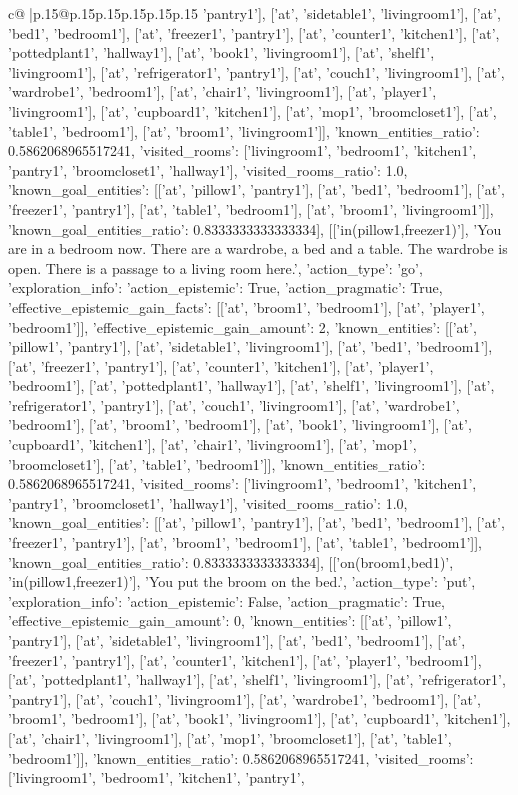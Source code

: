 \documentclass{article}
\begin{document}
{\begin{supertabular}{c@{$\;$}|p{.15\linewidth}@{}p{.15\linewidth}p{.15\linewidth}p{.15\linewidth}p{.15\linewidth}p{.15\linewidth}}
{{{'pantry1'], ['at', 'sidetable1', 'livingroom1'], ['at', 'bed1', 'bedroom1'], ['at', 'freezer1', 'pantry1'], ['at', 'counter1', 'kitchen1'], ['at', 'pottedplant1', 'hallway1'], ['at', 'book1', 'livingroom1'], ['at', 'shelf1', 'livingroom1'], ['at', 'refrigerator1', 'pantry1'], ['at', 'couch1', 'livingroom1'], ['at', 'wardrobe1', 'bedroom1'], ['at', 'chair1', 'livingroom1'], ['at', 'player1', 'livingroom1'], ['at', 'cupboard1', 'kitchen1'], ['at', 'mop1', 'broomcloset1'], ['at', 'table1', 'bedroom1'], ['at', 'broom1', 'livingroom1']], 'known_entities_ratio': 0.5862068965517241, 'visited_rooms': ['livingroom1', 'bedroom1', 'kitchen1', 'pantry1', 'broomcloset1', 'hallway1'], 'visited_rooms_ratio': 1.0, 'known_goal_entities': [['at', 'pillow1', 'pantry1'], ['at', 'bed1', 'bedroom1'], ['at', 'freezer1', 'pantry1'], ['at', 'table1', 'bedroom1'], ['at', 'broom1', 'livingroom1']], 'known_goal_entities_ratio': 0.8333333333333334}}], [['in(pillow1,freezer1)'], 'You are in a bedroom now. There are a wardrobe, a bed and a table. The wardrobe is open. There is a passage to a living room here.', {'action_type': 'go', 'exploration_info': {'action_epistemic': True, 'action_pragmatic': True, 'effective_epistemic_gain_facts': [['at', 'broom1', 'bedroom1'], ['at', 'player1', 'bedroom1']], 'effective_epistemic_gain_amount': 2, 'known_entities': [['at', 'pillow1', 'pantry1'], ['at', 'sidetable1', 'livingroom1'], ['at', 'bed1', 'bedroom1'], ['at', 'freezer1', 'pantry1'], ['at', 'counter1', 'kitchen1'], ['at', 'player1', 'bedroom1'], ['at', 'pottedplant1', 'hallway1'], ['at', 'shelf1', 'livingroom1'], ['at', 'refrigerator1', 'pantry1'], ['at', 'couch1', 'livingroom1'], ['at', 'wardrobe1', 'bedroom1'], ['at', 'broom1', 'bedroom1'], ['at', 'book1', 'livingroom1'], ['at', 'cupboard1', 'kitchen1'], ['at', 'chair1', 'livingroom1'], ['at', 'mop1', 'broomcloset1'], ['at', 'table1', 'bedroom1']], 'known_entities_ratio': 0.5862068965517241, 'visited_rooms': ['livingroom1', 'bedroom1', 'kitchen1', 'pantry1', 'broomcloset1', 'hallway1'], 'visited_rooms_ratio': 1.0, 'known_goal_entities': [['at', 'pillow1', 'pantry1'], ['at', 'bed1', 'bedroom1'], ['at', 'freezer1', 'pantry1'], ['at', 'broom1', 'bedroom1'], ['at', 'table1', 'bedroom1']], 'known_goal_entities_ratio': 0.8333333333333334}}], [['on(broom1,bed1)', 'in(pillow1,freezer1)'], 'You put the broom on the bed.', {'action_type': 'put', 'exploration_info': {'action_epistemic': False, 'action_pragmatic': True, 'effective_epistemic_gain_amount': 0, 'known_entities': [['at', 'pillow1', 'pantry1'], ['at', 'sidetable1', 'livingroom1'], ['at', 'bed1', 'bedroom1'], ['at', 'freezer1', 'pantry1'], ['at', 'counter1', 'kitchen1'], ['at', 'player1', 'bedroom1'], ['at', 'pottedplant1', 'hallway1'], ['at', 'shelf1', 'livingroom1'], ['at', 'refrigerator1', 'pantry1'], ['at', 'couch1', 'livingroom1'], ['at', 'wardrobe1', 'bedroom1'], ['at', 'broom1', 'bedroom1'], ['at', 'book1', 'livingroom1'], ['at', 'cupboard1', 'kitchen1'], ['at', 'chair1', 'livingroom1'], ['at', 'mop1', 'broomcloset1'], ['at', 'table1', 'bedroom1']], 'known_entities_ratio': 0.5862068965517241, 'visited_rooms': ['livingroom1', 'bedroom1', 'kitchen1', 'pantry1', }}}
\end{supertabular}}
\end{document}
